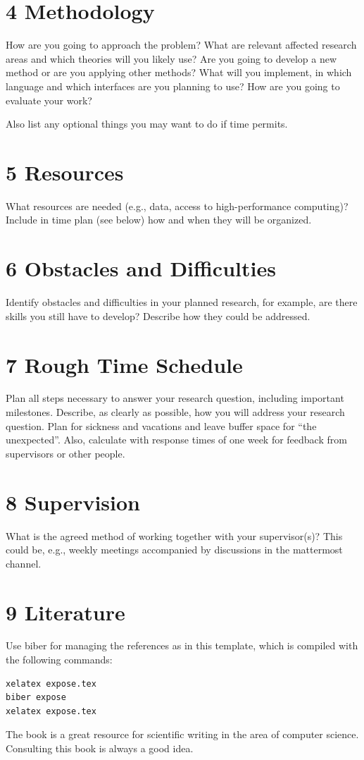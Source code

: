 \documentclass[a4paper,11pt]{article}
\begin{document}
\section*{4 Methodology}
How are you going to approach the problem? What are relevant affected research areas and which theories will you likely use? Are you going to develop a new method or are you applying other methods? What will you implement, in which language and which interfaces are you planning to use? How are you going to evaluate your work?

Also list any optional things you may want to do if time permits.

\clearpage

\section*{5 Resources}
What resources are needed (e.g., data, access to high-performance computing)? Include in time plan (see below) how and when they will be organized.

\section*{6 Obstacles and Difficulties}
Identify obstacles and difficulties in your planned research, for example, are there skills you still have to develop? Describe how they could be addressed.

\section*{7 Rough Time Schedule}
Plan all steps necessary to answer your research question, including important milestones. Describe, as clearly as possible, how you will address your research question. Plan for sickness and vacations and leave buffer space for “the unexpected”. Also, calculate with response times of one week for feedback from supervisors or other people.

\section*{8 Supervision}
What is the agreed method of working together with your supervisor(s)? This could be, e.g., weekly meetings accompanied by discussions in the mattermost channel.

\section*{9 Literature}
Use biber for managing the references as in this template, which is compiled with the following commands:
\begin{verbatim}
xelatex expose.tex
biber expose
xelatex expose.tex
\end{verbatim}
The book \cite{zobel2015} is a great resource for scientific writing in the area of computer science. Consulting this book is always a good idea.

\printbibliography[title=References]
\end{document}
